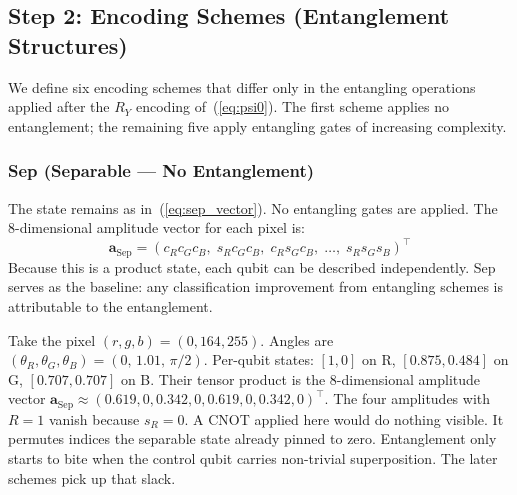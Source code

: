 \documentclass[conference,compsoc]{IEEEtran}
\begin{document}
\subsection{Step 2: Encoding Schemes (Entanglement Structures)}
\label{sec:schemes}

We define six encoding schemes that differ only in the entangling operations applied after the $R_Y$ encoding of~(\ref{eq:psi0}).
The first scheme applies no entanglement; the remaining five apply entangling gates of increasing complexity.


\subsubsection{Sep (Separable --- No Entanglement)}
\label{sec:sep}
The state remains as in~(\ref{eq:sep_vector}).
No entangling gates are applied.
The 8-dimensional amplitude vector for each pixel is:
\begin{equation}
    \mathbf{a}_\text{Sep} = (c_R c_G c_B,\; s_R c_G c_B,\; c_R s_G c_B,\; \ldots,\; s_R s_G s_B)^\top
    \label{eq:amps_sep}
\end{equation}
Because this is a product state, each qubit can be described independently.
Sep serves as the baseline: any classification improvement from entangling schemes is attributable to the entanglement.

Take the pixel $(r, g, b) = (0, 164, 255)$. Angles are $(\theta_R, \theta_G, \theta_B) = (0,\, 1.01,\, \pi/2)$. Per-qubit states: $[1, 0]$ on R, $[0.875, 0.484]$ on G, $[0.707, 0.707]$ on B. Their tensor product is the 8-dimensional amplitude vector $\mathbf{a}_\text{Sep} \approx (0.619, 0, 0.342, 0, 0.619, 0, 0.342, 0)^\top$. The four amplitudes with $R = 1$ vanish because $s_R = 0$. A CNOT applied here would do nothing visible. It permutes indices the separable state already pinned to zero. Entanglement only starts to bite when the control qubit carries non-trivial superposition. The later schemes pick up that slack.
\end{document}
